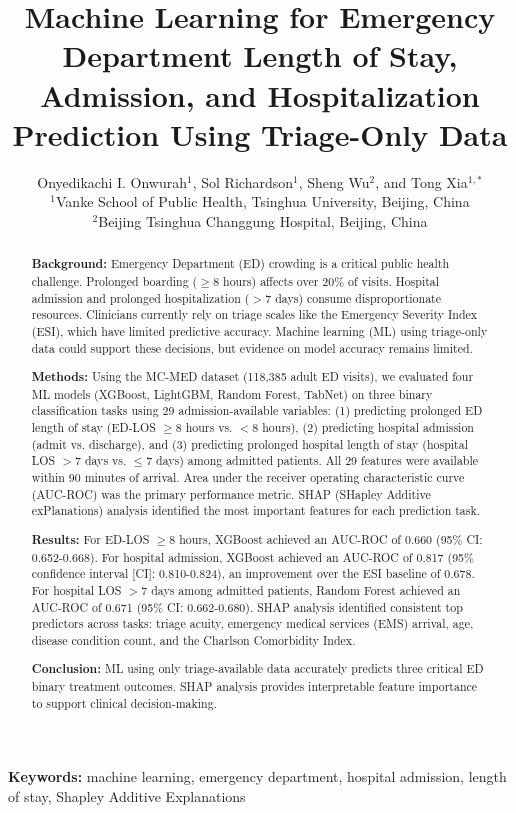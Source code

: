 \documentclass[harvard,article]{frontiersinFPHY_FAMS}
\title{Machine Learning for Emergency Department Length of Stay, Admission, and Hospitalization Prediction Using Triage-Only Data}
\author{Onyedikachi I. Onwurah$^{1}$, Sol Richardson$^{1}$, Sheng Wu$^{2}$, and  Tong Xia$^{1,*}$ \\
\vspace{0.2cm}
\small{$^{1}$Vanke School of Public Health, Tsinghua University, Beijing, China}\\
\small{$^{2}$Beijing Tsinghua Changgung Hospital, Beijing, China} \\
}
\begin{document}
\maketitle

\begin{abstract}

\noindent\textbf{Background:} Emergency Department (ED) crowding is a critical public health challenge. Prolonged boarding ($\geq$8 hours) affects over 20\% of visits. Hospital admission and prolonged hospitalization ($>$7 days) consume disproportionate resources. Clinicians currently rely on triage scales like the Emergency Severity Index (ESI), which have limited predictive accuracy. Machine learning (ML) using triage-only data could support these decisions, but evidence on model accuracy remains limited.

\noindent\textbf{Methods:} Using the MC-MED dataset (118,385 adult ED visits), we evaluated four ML models (XGBoost, LightGBM, Random Forest, TabNet) on three binary classification tasks using 29 admission-available variables: (1) predicting prolonged ED length of stay (ED-LOS $\geq$8 hours vs. $<$8 hours), (2) predicting hospital admission (admit vs. discharge), and (3) predicting prolonged hospital length of stay (hospital LOS $>$7 days vs. $\leq$7 days) among admitted patients. All 29 features were available within 90 minutes of arrival. Area under the receiver operating characteristic curve (AUC-ROC) was the primary performance metric. SHAP (SHapley Additive exPlanations) analysis identified the most important features for each prediction task.

\noindent\textbf{Results:} For ED-LOS $\geq$8 hours, XGBoost achieved an AUC-ROC of 0.660 (95\% CI: 0.652-0.668). For hospital admission, XGBoost achieved an AUC-ROC of 0.817 (95\% confidence interval [CI]: 0.810-0.824), an improvement over the ESI baseline of 0.678. For hospital LOS $>$7 days among admitted patients, Random Forest achieved an AUC-ROC of 0.671 (95\% CI: 0.662-0.680). SHAP analysis identified consistent top predictors across tasks: triage acuity, emergency medical services (EMS) arrival, age, disease condition count, and the Charlson Comorbidity Index.

\noindent\textbf{Conclusion:} ML using only triage-available data accurately predicts three critical ED binary treatment outcomes. SHAP analysis provides interpretable feature importance to support clinical decision-making.
\end{abstract}
\noindent\textbf{Keywords:} machine learning, emergency department, hospital admission, length of stay, Shapley Additive Explanations
\end{document}
